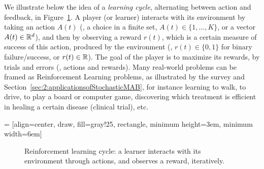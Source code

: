 We illustrate below the idea of a \emph{learning cycle}, alternating between action and feedback,
in Figure~\ref{fig:1:ReinforcementLearningCycle}.
A player (or learner) interacts with its environment by taking an action $A(t)$ (\eg, a choice in a finite set, $A(t)\in\{1,\dots,K\}$, or a vector $A(t)\in\mathbb{R}^d$), and then by observing a reward $r(t)$, which is a certain measure of success of this action, produced by the environment (\eg, $r(t)\in\{0,1\}$ for binary failure/success, or $r(t)\in\mathbb{R}$).
The goal of the player is to maximize its rewards, by trials and errors (\ie, actions and rewards).
Many real-world problems can be framed as Reinforcement Learning problems, as illustrated by the survey \cite{bouneffouf2019survey} and Section~\ref{sec:2:applicationsofStochasticMAB}, for instance learning to walk, to drive, to play a board or computer game, discovering which treatment is efficient in healing a certain disease (clinical trial), etc.


 = [align=center, draw, fill=gray!25, rectangle, minimum height=3em, minimum width=6em]
\begin{figure}[h!]
    \centering
\caption{Reinforcement learning cycle: a learner interacts with its environment through actions, and observes a reward, iteratively.}
\label{fig:1:ReinforcementLearningCycle}
\end{figure}


